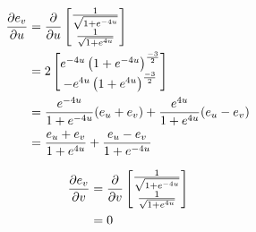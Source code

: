 \documentclass[a4paper, 11pt]{article}
\begin{document}
\begin{enumerate}[label=(\alph*)]
\begin{mdframed}
          \begin{minipage}[t]{0.5\textwidth}
            \begin{align*}
              \dfrac{\partial e_v}{\partial u} & = \dfrac{\partial}{\partial u}\begin{bmatrix}
                                    \frac{1}{\sqrt{1 + e^{-4u}}} \\
                                    \frac{1}{\sqrt{1 + e^{4u}}}
                                  \end{bmatrix}         \\
                        & =  2\begin{bmatrix}
                                e^{-4u}\left( 1+e^{-4u} \right)^{\frac{-3}2} \\
                                -e^{4u}\left( 1+e^{4u} \right)^{\frac{-3}2}
                              \end{bmatrix} \\
                        & =
              \frac{e^{-4u}}{1+e^{-4u}}(e_u+e_v)
              +\frac{e^{4u}}{1+e^{4u}}(e_u-e_v)                            \\
                        & =
              \frac{e_u+e_v}{1+e^{4u}}
              +\frac{e_u-e_v}{1+e^{-4u}}
            \end{align*}
          \end{minipage}\begin{minipage}[t]{0.5\textwidth}
            \begin{align*}
              \dfrac{\partial e_v}{\partial v} & = \dfrac{\partial}{\partial v}\begin{bmatrix}
                                    \frac{1}{\sqrt{1 + e^{-4u}}} \\
                                    \frac{1}{\sqrt{1 + e^{4u}}}
                                  \end{bmatrix} \\
                        & = 0\end{align*}
          \end{minipage}
        \end{mdframed}



\end{enumerate}
\end{document}
